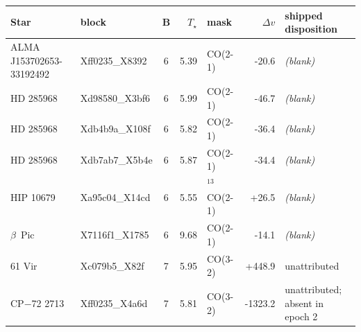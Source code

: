 \begin{tabular}{@{}l@{~}l@{~}c@{~}r@{~}l@{~}r@{~~}l@{}}
\hline
Star & block & B & $T_\star$ & mask & $\Delta v$ & shipped disposition \\
\hline
ALMA J153702653-33192492 & Xff0235\_X8392 & 6 & 5.39 & CO(2-1) & -20.6 & \emph{(blank)} \\
HD 285968 & Xd98580\_X3bf6 & 6 & 5.99 & CO(2-1) & -46.7 & \emph{(blank)} \\
HD 285968 & Xdb4b9a\_X108f & 6 & 5.82 & CO(2-1) & -36.4 & \emph{(blank)} \\
HD 285968 & Xdb7ab7\_X5b4e & 6 & 5.87 & CO(2-1) & -34.4 & \emph{(blank)} \\
HIP 10679 & Xa95c04\_X14cd & 6 & 5.55 & $^{13}$CO(2-1) & +26.5 & \emph{(blank)} \\
$\beta$~Pic & X7116f1\_X1785 & 6 & 9.68 & CO(2-1) & -14.1 & \emph{(blank)} \\
61 Vir & Xc079b5\_X82f & 7 & 5.95 & CO(3-2) & +448.9 & unattributed \\
CP$-$72 2713 & Xff0235\_X4a6d & 7 & 5.81 & CO(3-2) & -1323.2 & unattributed; absent in epoch 2 \\
\hline
\end{tabular}
